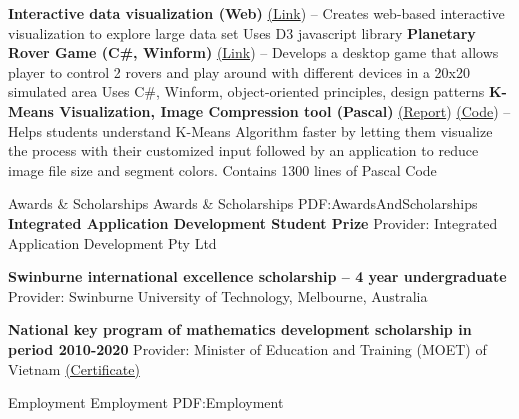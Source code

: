 \documentclass[letterpaper,MMMyyyy,nonstopmode]{simpleresumecv}
\begin{document}
\begin{Body}
\BulletItem
\textbf{Interactive data visualization (Web)} \href{https://dunglai.github.io/SwinWork/cars-visual/index.html}{(\color{blue}Link})
\hfill
{} --
\SubBulletItem Creates web-based interactive visualization to explore large data set \SubBulletItem Uses D3 javascript library
\Gap\Gap\Gap
\BulletItem
\textbf{Planetary Rover Game (C\#, Winform)} \href{https://dunglai.github.io/2017/05/27/Planetary-Rover/}{(\color{blue}Link})
\hfill
{} --
\SubBulletItem Develops a desktop game that allows player to control 2 rovers and play around with different devices in a 20x20 simulated area
\SubBulletItem Uses C\#, Winform, object-oriented principles, design patterns
\Gap\Gap\Gap
\BulletItem
\textbf{K-Means Visualization, Image Compression tool (Pascal)} \href{https://dunglai.github.io/public/post-assets/Kmeans/Report.pdf}{(\color{blue}Report}) \href{https://github.com/DungLai/Image-Compression-Segmentation}{(\color{blue}Code})
\hfill
{} --
\SubBulletItem Helps students understand K-Means Algorithm faster by letting them visualize the process with their customized input followed by an application to reduce image file size and segment colors.
\SubBulletItem Contains 1300 lines of Pascal Code



\Section
{Awards \&\newline
Scholarships}
{Awards \& Scholarships}
{PDF:AwardsAndScholarships}
\BulletItem
\textbf{Integrated Application Development Student Prize}
\hfill
{}
\SubBulletItem Provider: Integrated Application Development Pty Ltd

\Gap\Gap\Gap

\BulletItem
\textbf{Swinburne international excellence scholarship – 4 year undergraduate}
\hfill
{}
\SubBulletItem Provider: Swinburne University of Technology, Melbourne, Australia

\Gap\Gap\Gap
\BulletItem
\textbf{National key program of mathematics development scholarship in period 2010-2020}
\hfill
{}
\SubBulletItem Provider: Minister of Education and Training (MOET) of Vietnam \href{https://dunglai.github.io/public/post-assets/About/CVLatex/MathCert.png}{(\color{blue}Certificate)}

\Section 
{Employment}
{Employment}
{PDF:Employment}


\end{Body}
\end{document}
